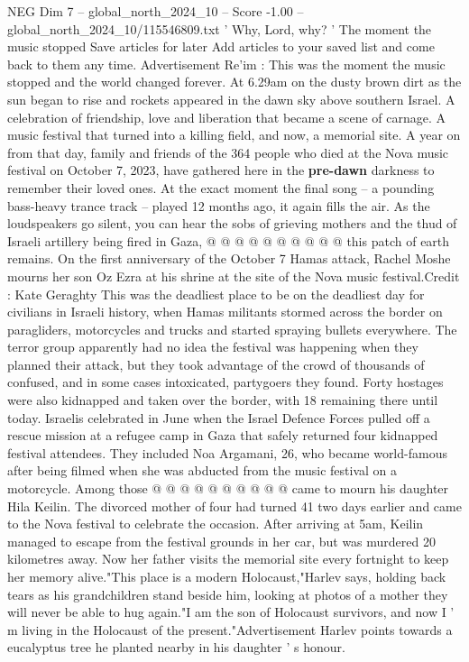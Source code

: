 \begin{textsample}{NEG Dim 7 – global\_north\_2024\_10 – Score -1.00 – global\_north\_2024\_10/115546809.txt}  \label{ex:f7_neg_359}
' Why, Lord, why? ' The moment the music stopped Save articles for later Add articles to your saved list and come back to them any time.
Advertisement Re'im : This was the moment the music stopped and the world changed forever.
At 6.29am on the dusty brown dirt as the sun began to rise and rockets appeared in the dawn sky above southern Israel.
A celebration of friendship, love and liberation that became a scene of carnage.
A music festival that turned into a killing field, and now, a memorial site.
A year on from that day, family and friends of the 364 people who died at the Nova music festival on October 7, 2023, have gathered here in the \textbf{pre-dawn} darkness to remember their loved ones.
At the exact moment the final song -- a pounding bass-heavy trance track -- played 12 months ago, it again fills the air.
As the loudspeakers go silent, you can hear the sobs of grieving mothers and the thud of Israeli artillery being fired in Gaza, @ @ @ @ @ @ @ @ @ @ this patch of earth remains.
On the first anniversary of the October 7 Hamas attack, Rachel Moshe mourns her son Oz Ezra at his shrine at the site of the Nova music festival.Credit : Kate Geraghty This was the deadliest place to be on the deadliest day for civilians in Israeli history, when Hamas militants stormed across the border on paragliders, motorcycles and trucks and started spraying bullets everywhere.
The terror group apparently had no idea the festival was happening when they planned their attack, but they took advantage of the crowd of thousands of confused, and in some cases intoxicated, partygoers they found.
Forty hostages were also kidnapped and taken over the border, with 18 remaining there until today.
Israelis celebrated in June when the Israel Defence Forces pulled off a rescue mission at a refugee camp in Gaza that safely returned four kidnapped festival attendees.
They included Noa Argamani, 26, who became world-famous after being filmed when she was abducted from the music festival on a motorcycle.
Among those @ @ @ @ @ @ @ @ @ @ came to mourn his daughter Hila Keilin.
The divorced mother of four had turned 41 two days earlier and came to the Nova festival to celebrate the occasion.
After arriving at 5am, Keilin managed to escape from the festival grounds in her car, but was murdered 20 kilometres away.
Now her father visits the memorial site every fortnight to keep her memory alive."This place is a modern Holocaust,"Harlev says, holding back tears as his grandchildren stand beside him, looking at photos of a mother they will never be able to hug again."I am the son of Holocaust survivors, and now I ' m living in the Holocaust of the present."Advertisement Harlev points towards a eucalyptus tree he planted nearby in his daughter ' s honour.

\end{textsample}

